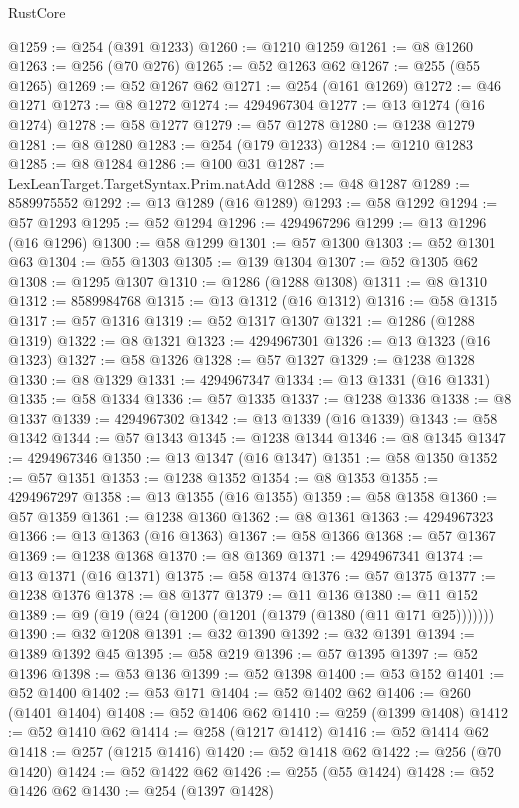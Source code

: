 \begin{lexlean}{RustCore}
\begin{coremodule}
@1259 := @254 (@391 @1233)
@1260 := @1210 @1259
@1261 := @8 @1260
@1263 := @256 (@70 @276)
@1265 := @52 @1263 @62
@1267 := @255 (@55 @1265)
@1269 := @52 @1267 @62
@1271 := @254 (@161 @1269)
@1272 := @46 @1271
@1273 := @8 @1272
@1274 := 4294967304
@1277 := @13 @1274 (@16 @1274)
@1278 := @58 @1277
@1279 := @57 @1278
@1280 := @1238 @1279
@1281 := @8 @1280
@1283 := @254 (@179 @1233)
@1284 := @1210 @1283
@1285 := @8 @1284
@1286 := @100 @31
@1287 := LexLeanTarget.TargetSyntax.Prim.natAdd
@1288 := @48 @1287
@1289 := 8589975552
@1292 := @13 @1289 (@16 @1289)
@1293 := @58 @1292
@1294 := @57 @1293
@1295 := @52 @1294
@1296 := 4294967296
@1299 := @13 @1296 (@16 @1296)
@1300 := @58 @1299
@1301 := @57 @1300
@1303 := @52 @1301 @63
@1304 := @55 @1303
@1305 := @139 @1304
@1307 := @52 @1305 @62
@1308 := @1295 @1307
@1310 := @1286 (@1288 @1308)
@1311 := @8 @1310
@1312 := 8589984768
@1315 := @13 @1312 (@16 @1312)
@1316 := @58 @1315
@1317 := @57 @1316
@1319 := @52 @1317 @1307
@1321 := @1286 (@1288 @1319)
@1322 := @8 @1321
@1323 := 4294967301
@1326 := @13 @1323 (@16 @1323)
@1327 := @58 @1326
@1328 := @57 @1327
@1329 := @1238 @1328
@1330 := @8 @1329
@1331 := 4294967347
@1334 := @13 @1331 (@16 @1331)
@1335 := @58 @1334
@1336 := @57 @1335
@1337 := @1238 @1336
@1338 := @8 @1337
@1339 := 4294967302
@1342 := @13 @1339 (@16 @1339)
@1343 := @58 @1342
@1344 := @57 @1343
@1345 := @1238 @1344
@1346 := @8 @1345
@1347 := 4294967346
@1350 := @13 @1347 (@16 @1347)
@1351 := @58 @1350
@1352 := @57 @1351
@1353 := @1238 @1352
@1354 := @8 @1353
@1355 := 4294967297
@1358 := @13 @1355 (@16 @1355)
@1359 := @58 @1358
@1360 := @57 @1359
@1361 := @1238 @1360
@1362 := @8 @1361
@1363 := 4294967323
@1366 := @13 @1363 (@16 @1363)
@1367 := @58 @1366
@1368 := @57 @1367
@1369 := @1238 @1368
@1370 := @8 @1369
@1371 := 4294967341
@1374 := @13 @1371 (@16 @1371)
@1375 := @58 @1374
@1376 := @57 @1375
@1377 := @1238 @1376
@1378 := @8 @1377
@1379 := @11 @136
@1380 := @11 @152
@1389 := @9 (@19 (@24 (@1200 (@1201 (@1379 (@1380 (@11 @171 @25)))))))
@1390 := @32 @1208
@1391 := @32 @1390
@1392 := @32 @1391
@1394 := @1389 @1392 @45
@1395 := @58 @219
@1396 := @57 @1395
@1397 := @52 @1396
@1398 := @53 @136
@1399 := @52 @1398
@1400 := @53 @152
@1401 := @52 @1400
@1402 := @53 @171
@1404 := @52 @1402 @62
@1406 := @260 (@1401 @1404)
@1408 := @52 @1406 @62
@1410 := @259 (@1399 @1408)
@1412 := @52 @1410 @62
@1414 := @258 (@1217 @1412)
@1416 := @52 @1414 @62
@1418 := @257 (@1215 @1416)
@1420 := @52 @1418 @62
@1422 := @256 (@70 @1420)
@1424 := @52 @1422 @62
@1426 := @255 (@55 @1424)
@1428 := @52 @1426 @62
@1430 := @254 (@1397 @1428)

\end{coremodule}
\end{lexlean}
